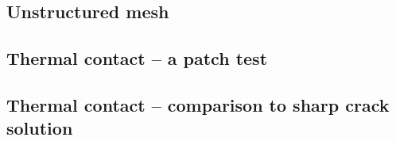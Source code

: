 \subsection{Unstructured mesh}

\begin{frame}
\end{frame}

\subsection{Thermal contact -- a patch test}

\begin{frame}
\end{frame}

\subsection{Thermal contact -- comparison to sharp crack solution}

\begin{frame}
\end{frame}